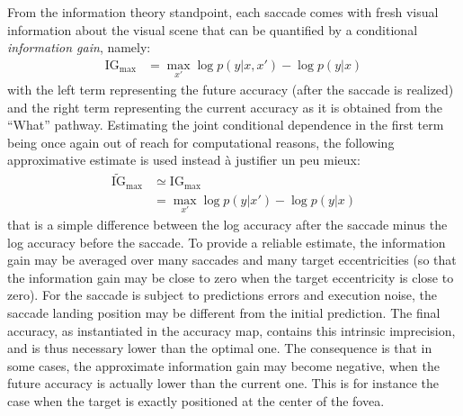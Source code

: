 From the information theory standpoint, each saccade comes with fresh visual information about the visual scene that can be quantified by a conditional \emph{information gain}, namely:
\begin{align}
\text{IG}_\text{max} &= \max_{x'} \log p(y|x,x') - \log p(y|x)\nonumber
\end{align}
with the left term representing the future accuracy (after the saccade is realized) and the right term representing the current accuracy as it is obtained from the ``What'' pathway.
Estimating the joint conditional dependence in the first term being once again out of reach for computational reasons, the following approximative estimate is used instead {\color{green} à justifier un peu mieux}:
\begin{align}
\tilde{\text{IG}}_\text{max}&\simeq \text{IG}_\text{max}\nonumber\\
&=\max_{x'} \log p(y|x') - \log p(y|x)\label{eq:IG}
\end{align}
that is a simple difference between the log accuracy after the saccade minus the log accuracy before the saccade.
To provide a reliable estimate, the information gain may be averaged over many saccades and many target eccentricities (so that the information gain may be close to zero when the target eccentricity is close to zero).
For the saccade is subject to predictions errors and execution noise, the saccade landing position may be different from the initial prediction. The final accuracy, as instantiated in the accuracy map, contains this intrinsic imprecision, and is thus necessary lower than the optimal one. The consequence is that in some cases, the approximate information gain may become negative, when the future accuracy is actually lower than the current one. This is for instance the case when the target is exactly positioned at the center of the fovea.
